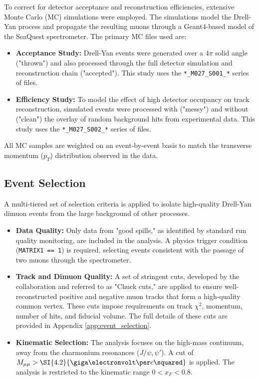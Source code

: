 \documentclass[11pt]{article}
\begin{document}
To correct for detector acceptance and reconstruction efficiencies, extensive Monte Carlo (MC) simulations were employed. The simulations model the Drell-Yan process and propagate the resulting muons through a Geant4-based model of the SeaQuest spectrometer. The primary MC files used are:
\begin{itemize}
    \item \textbf{Acceptance Study:} Drell-Yan events were generated over a $4\pi$ solid angle ("thrown") and also processed through the full detector simulation and reconstruction chain ("accepted"). This study uses the \texttt{*\_M027\_S001\_*} series of files.
    \item \textbf{Efficiency Study:} To model the effect of high detector occupancy on track reconstruction, simulated events were processed with ("messy") and without ("clean") the overlay of random background hits from experimental data. This study uses the \texttt{*\_M027\_S002\_*} series of files.
\end{itemize}
All MC samples are weighted on an event-by-event basis to match the transverse momentum ($p_T$) distribution observed in the data.

\subsection{Event Selection}
\label{sec:event_selection}
A multi-tiered set of selection criteria is applied to isolate high-quality Drell-Yan dimuon events from the large background of other processes.
\begin{itemize}
    \item \textbf{Data Quality:} Only data from "good spills," as identified by standard run quality monitoring, are included in the analysis. A physics trigger condition (\texttt{MATRIX1 == 1}) is required, selecting events consistent with the passage of two muons through the spectrometer.
    \item \textbf{Track and Dimuon Quality:} A set of stringent cuts, developed by the collaboration and referred to as "Chuck cuts," are applied to ensure well-reconstructed positive and negative muon tracks that form a high-quality common vertex. These cuts impose requirements on track $\chi^2$, momentum, number of hits, and fiducial volume. The full details of these cuts are provided in Appendix \ref{app:event_selection}.
    \item \textbf{Kinematic Selection:} The analysis focuses on the high-mass continuum, away from the charmonium resonances ($J/\psi, \psi'$). A cut of $M_{\mu\mu} > \SI{4.2}{\giga\electronvolt\per c\squared}$ is applied. The analysis is restricted to the kinematic range $0 < x_F < 0.8$.
\end{itemize}
\end{document}
